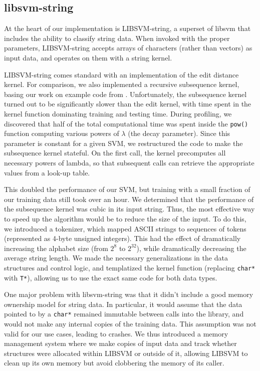 \documentclass[10pt]{article}
\begin{document}
\begin{multicols}{2}
\subsection{libsvm-string}

At the heart of our implementation is LIBSVM-string, a superset of libsvm that includes the ability to classify string data. \cite{libsvm-string} When invoked with the proper parameters, LIBSVM-string accepts arrays of characters (rather than vectors) as input data, and operates on them with a string kernel.

LIBSVM-string comes standard with an implementation of the edit distance kernel. For comparison, we also implemented a recursive subsequence kernel, basing our work on example code from \cite{learning-kernel-classifiers}. Unfortunately, the subsequence kernel turned out to be significantly slower than the edit kernel, with time spent in the kernel function dominating training and testing time. During profiling, we discovered that half of the total computational time was spent inside the \texttt{pow()} function computing various powers of $\lambda$ (the decay parameter). Since this parameter is constant for a given SVM, we restructured the code to make the subsequence kernel stateful. On the first call, the kernel precomputes all necessary powers of lambda, so that subsequent calls can retrieve the appropriate values from a look-up table.

This doubled the performance of our SVM, but training with a small fraction of our training data still took over an hour. We determined that the performance of the subsequence kernel was cubic in its input string. Thus, the most effective way to speed up the algorithm would be to reduce the size of the input. To do this, we introduced a tokenizer, which mapped ASCII strings to sequences of tokens (represented as 4-byte unsigned integers). This had the effect of dramatically increasing the alphabet size (from $2^8$ to $2^{32}$), while dramatically decreasing the average string length. We made the necessary generalizations in the data structures and control logic, and templatized the kernel function (replacing \texttt{char*} with \texttt{T*}), allowing us to use the exact same code for both data types.

One major problem with libsvm-string was that it didn't include a good memory ownership model for string data. In particular, it would assume that the data pointed to by a \texttt{char*} remained immutable between calls into the library, and would not make any internal copies of the training data. This assumption was not valid for our use cases, leading to crashes. We thus introduced a memory management system where we make copies of input data and track whether structures were allocated within LIBSVM or outside of it, allowing LIBSVM to clean up its own memory but avoid clobbering the memory of its caller.


\end{multicols}
\end{document}
